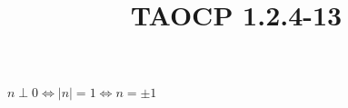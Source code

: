 \documentclass{article}
\title{TAOCP 1.2.4\mbox{-}13}
\begin{document}
\maketitle

\( n \perp 0 \iff |n| = 1 \iff n = \pm 1 \)
\end{document}
